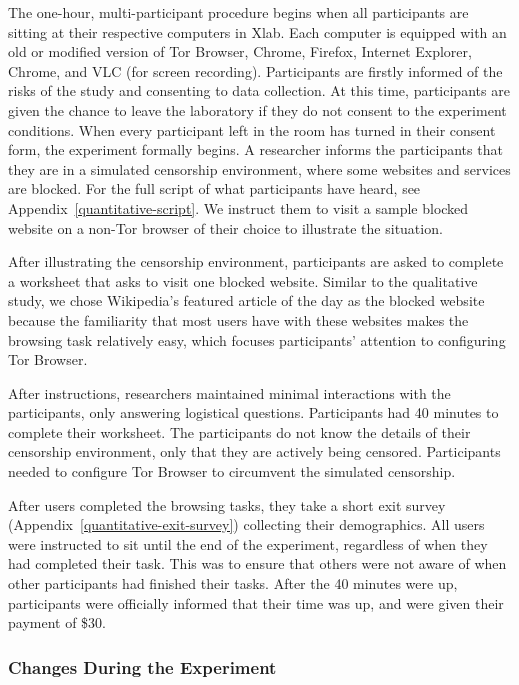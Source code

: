 \documentclass[USenglish,oneside,twocolumn]{article}
\begin{document}
The one-hour, multi-participant procedure begins when all participants are sitting at their
respective computers in Xlab. Each computer is equipped with an old or modified version
of Tor Browser, Chrome, Firefox, Internet Explorer,  Chrome, and VLC (for screen recording). 
Participants are firstly informed of the risks of the study and consenting to data collection.  At
this time, participants are given the chance to leave the laboratory if they do not consent to 
the experiment conditions. When every participant left in the room has turned in their consent
form, the experiment formally begins. A researcher informs the participants that they are in a
simulated censorship environment, where some websites and services are blocked. 
For the full script of what participants have heard, see Appendix~\ref{quantitative-script}. We
instruct them to visit a sample blocked website on a non-Tor browser of their choice to illustrate 
the situation.

After illustrating the censorship environment, participants are asked to 
complete a worksheet that asks to visit one blocked website. 
Similar to the qualitative study, we chose Wikipedia's featured article of the day 
as the blocked website because the familiarity 
that most users have with these websites makes the browsing task relatively easy, 
which focuses participants' attention to configuring Tor Browser. 

After instructions, researchers maintained minimal interactions with the participants, 
only answering logistical questions. Participants had
40 minutes to complete their worksheet. 
The participants do not know the details of their censorship environment,
only that they are actively being censored. Participants needed to configure Tor Browser to 
circumvent the simulated censorship. 

After users completed the browsing tasks, they take a short exit survey (Appendix~\ref{quantitative-exit-survey})
collecting their demographics. All users were instructed to sit until the end of the experiment,
regardless of when they had completed their task. This was to ensure that others were not 
aware of when other participants had finished their tasks. After the 40 minutes were up, 
participants were officially informed that their time was up, and were given their payment of 
\$30. 

\subsubsection{Changes During the Experiment} 
\end{document}
